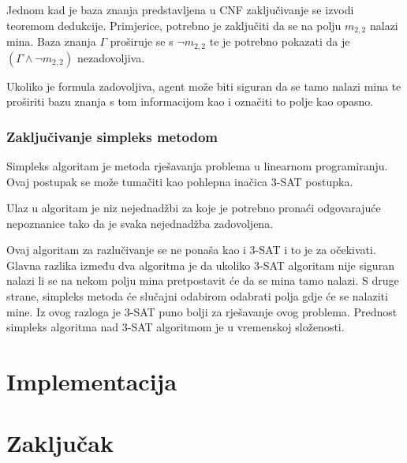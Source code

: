 \documentclass{article}
\begin{document}
Jednom kad je baza znanja predstavljena u CNF zaključivanje se izvodi teoremom dedukcije.
Primjerice, potrebno je zaključiti da se na polju $m_{2, 2}$ nalazi mina. Baza znanja $\Gamma$
proširuje se s $\neg m_{2, 2}$ te je potrebno pokazati da je $(\Gamma \wedge \neg m_{2, 2})$
nezadovoljiva.

Ukoliko je formula zadovoljiva, agent može biti siguran da se tamo nalazi mina te proširiti
bazu znanja s tom informacijom kao i označiti to polje kao opasno.


\subsubsection{Zaključivanje simpleks metodom}
Simpleks algoritam je metoda rješavanja problema u linearnom programiranju. Ovaj postupak se
može tumačiti kao pohlepna inačica 3-SAT postupka.

Ulaz u algoritam je niz nejednadžbi za koje je potrebno pronaći odgovarajuće nepoznanice
tako da je svaka nejednadžba zadovoljena.


Ovaj algoritam za razlučivanje se ne ponaša kao i 3-SAT i to je za očekivati. Glavna razlika
između dva algoritma je da ukoliko 3-SAT algoritam nije siguran nalazi li se na nekom polju
mina pretpostavit će da se mina tamo nalazi. S druge strane, simpleks metoda će slučajni odabirom odabrati polja gdje će se nalaziti mine. Iz ovog razloga je 3-SAT puno bolji za rješavanje
ovog problema. Prednost simpleks algoritma nad 3-SAT algoritmom je u vremenskoj složenosti.

\section{Implementacija}
\section{Zaključak}
\end{document}
